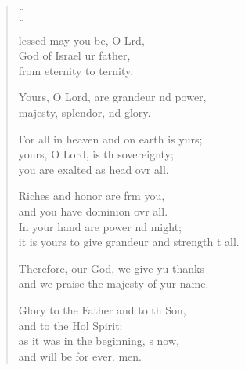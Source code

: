 \settowidth{\versewidth}{it is yours to give grandeur and strength to all.}
\begin{verse}[\versewidth]
  \begin{patverse}
    lessed may you be, O Lrd,\Flex\\
God of Israel ur father,\Med\\
from eternity to ternity.

Yours, O Lord, are grandeur nd power,\Med\\
majesty, splendor, nd glory.

For all in heaven and on earth is yurs;\Flex\\
yours, O Lord, is th sovereignty;\Med\\
you are exalted as head ovr all.

Riches and honor are frm you,\Med\\
and you have dominion ovr all.\\
In your hand are power nd might;\Med\\
it is yours to give grandeur and strength t all.

Therefore, our God, we give yu thanks\Med\\
and we praise the majesty of yur name.

Glory to the Father and to th Son,\Med\\
    and to the Hol Spirit:\\
as it was in the beginning, \pointup{\i}s now,\Med\\
    and will be for ever. men.
  \end{patverse}
\end{verse}
